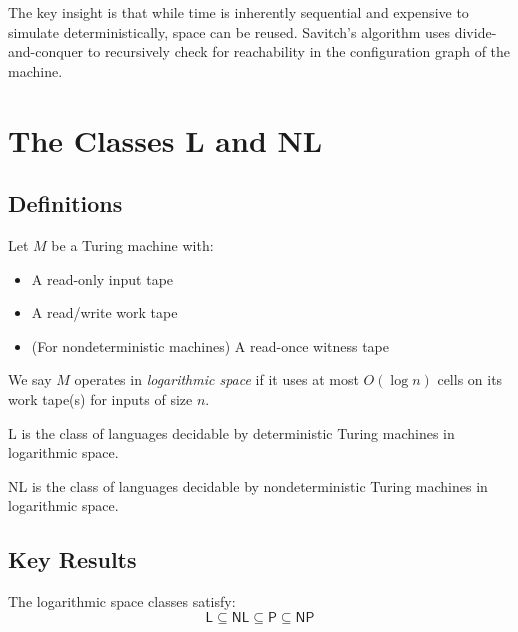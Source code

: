 \begin{remark}
The key insight is that while time is inherently sequential and expensive to simulate deterministically, space can be reused. Savitch's algorithm uses divide-and-conquer to recursively check for reachability in the configuration graph of the machine.
\end{remark}


\section{The Classes \textsf{L} and \textsf{NL}}

\subsection{Definitions}

\begin{definition}
Let $M$ be a Turing machine with:
\begin{itemize}
    \item A read-only input tape
    \item A read/write work tape
    \item (For nondeterministic machines) A read-once witness tape
\end{itemize}
We say $M$ operates in \emph{logarithmic space} if it uses at most $O(\log n)$ cells on its work tape(s) for inputs of size $n$.
\end{definition}

\begin{definition}
\textsf{L} is the class of languages decidable by deterministic Turing machines in logarithmic space.
\end{definition}

\begin{definition}
\textsf{NL} is the class of languages decidable by nondeterministic Turing machines in logarithmic space.
\end{definition}

\subsection{Key Results}

\begin{theorem}
The logarithmic space classes satisfy:
\[
\textsf{L} \subseteq \textsf{NL} \subseteq \textsf{P} \subseteq \textsf{NP}
\]
\end{theorem}

